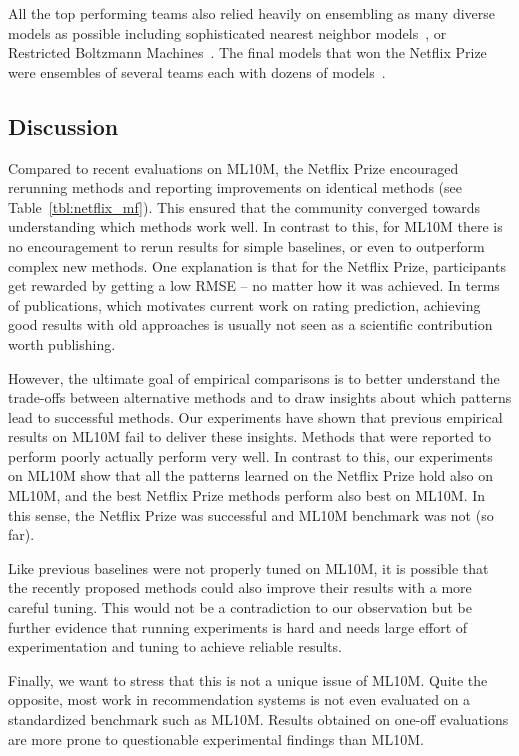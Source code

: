 \documentclass{article}
\begin{document}
All the top performing teams also relied heavily on ensembling as many diverse models as possible including sophisticated nearest neighbor models~\cite{koren:ieee09}, or Restricted Boltzmann Machines~\cite{salakhutdinov:icml07}.
The final models that won the Netflix Prize were ensembles of several teams each with dozens of models~\cite{koren:grandprize}.




\subsection{Discussion}

Compared to recent evaluations on ML10M, the Netflix Prize encouraged rerunning methods and reporting improvements on identical methods (see Table~\ref{tbl:netflix_mf}).
This ensured that the community converged towards understanding which methods work well.
In contrast to this, for ML10M there is no encouragement to rerun results for simple baselines, or even to outperform complex new methods.
One explanation is that for the Netflix Prize, participants get rewarded by getting a low RMSE -- no matter how it was achieved.
In terms of publications, which motivates current work on rating prediction, achieving good results with old approaches is usually not seen as a scientific contribution worth publishing.

However, the ultimate goal of empirical comparisons is to better understand the trade-offs between alternative methods and to draw insights about which patterns lead to successful methods.
Our experiments have shown that previous empirical results on ML10M fail to deliver these insights.
Methods that were reported to perform poorly actually perform very well.
In contrast to this, our experiments on ML10M show that all the patterns learned on the Netflix Prize hold also on ML10M, and the best Netflix Prize methods perform also best on ML10M.
In this sense, the Netflix Prize was successful and ML10M benchmark was not (so far).

Like previous baselines were not properly tuned on ML10M, it is possible that the recently proposed methods could also improve their results with a more careful tuning.
This would not be a contradiction to our observation but be further evidence that running experiments is hard and needs large effort of experimentation and tuning to achieve reliable results.

Finally, we want to stress that this is not a unique issue of ML10M.
Quite the opposite, most work in recommendation systems is not even evaluated on a standardized benchmark such as ML10M.
Results obtained on one-off evaluations are more prone to questionable experimental findings than ML10M.
\end{document}

